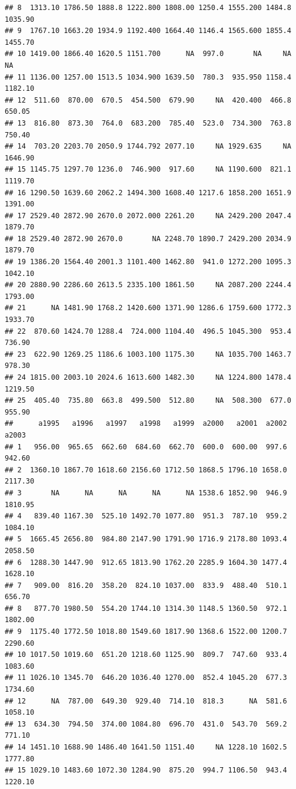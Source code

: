 \documentclass[11pt,]{article}
\begin{document}
\begin{verbatim}
## 8  1313.10 1786.50 1888.8 1222.800 1808.00 1250.4 1555.200 1484.8 1035.90
## 9  1767.10 1663.20 1934.9 1192.400 1664.40 1146.4 1565.600 1855.4 1455.70
## 10 1419.00 1866.40 1620.5 1151.700      NA  997.0       NA     NA      NA
## 11 1136.00 1257.00 1513.5 1034.900 1639.50  780.3  935.950 1158.4 1182.10
## 12  511.60  870.00  670.5  454.500  679.90     NA  420.400  466.8  650.05
## 13  816.80  873.30  764.0  683.200  785.40  523.0  734.300  763.8  750.40
## 14  703.20 2203.70 2050.9 1744.792 2077.10     NA 1929.635     NA 1646.90
## 15 1145.75 1297.70 1236.0  746.900  917.60     NA 1190.600  821.1 1119.70
## 16 1290.50 1639.60 2062.2 1494.300 1608.40 1217.6 1858.200 1651.9 1391.00
## 17 2529.40 2872.90 2670.0 2072.000 2261.20     NA 2429.200 2047.4 1879.70
## 18 2529.40 2872.90 2670.0       NA 2248.70 1890.7 2429.200 2034.9 1879.70
## 19 1386.20 1564.40 2001.3 1101.400 1462.80  941.0 1272.200 1095.3 1042.10
## 20 2880.90 2286.60 2613.5 2335.100 1861.50     NA 2087.200 2244.4 1793.00
## 21      NA 1481.90 1768.2 1420.600 1371.90 1286.6 1759.600 1772.3 1933.70
## 22  870.60 1424.70 1288.4  724.000 1104.40  496.5 1045.300  953.4  736.90
## 23  622.90 1269.25 1186.6 1003.100 1175.30     NA 1035.700 1463.7  978.30
## 24 1815.00 2003.10 2024.6 1613.600 1482.30     NA 1224.800 1478.4 1219.50
## 25  405.40  735.80  663.8  499.500  512.80     NA  508.300  677.0  955.90
##      a1995   a1996   a1997   a1998   a1999  a2000   a2001  a2002   a2003
## 1   956.00  965.65  662.60  684.60  662.70  600.0  600.00  997.6  942.60
## 2  1360.10 1867.70 1618.60 2156.60 1712.50 1868.5 1796.10 1658.0 2117.30
## 3       NA      NA      NA      NA      NA 1538.6 1852.90  946.9 1810.95
## 4   839.40 1167.30  525.10 1492.70 1077.80  951.3  787.10  959.2 1084.10
## 5  1665.45 2656.80  984.80 2147.90 1791.90 1716.9 2178.80 1093.4 2058.50
## 6  1288.30 1447.90  912.65 1813.90 1762.20 2285.9 1604.30 1477.4 1628.10
## 7   909.00  816.20  358.20  824.10 1037.00  833.9  488.40  510.1  656.70
## 8   877.70 1980.50  554.20 1744.10 1314.30 1148.5 1360.50  972.1 1802.00
## 9  1175.40 1772.50 1018.80 1549.60 1817.90 1368.6 1522.00 1200.7 2290.60
## 10 1017.50 1019.60  651.20 1218.60 1125.90  809.7  747.60  933.4 1083.60
## 11 1026.10 1345.70  646.20 1036.40 1270.00  852.4 1045.20  677.3 1734.60
## 12      NA  787.00  649.30  929.40  714.10  818.3      NA  581.6 1058.10
## 13  634.30  794.50  374.00 1084.80  696.70  431.0  543.70  569.2  771.10
## 14 1451.10 1688.90 1486.40 1641.50 1151.40     NA 1228.10 1602.5 1777.80
## 15 1029.10 1483.60 1072.30 1284.90  875.20  994.7 1106.50  943.4 1220.10

\end{verbatim}
\end{document}
